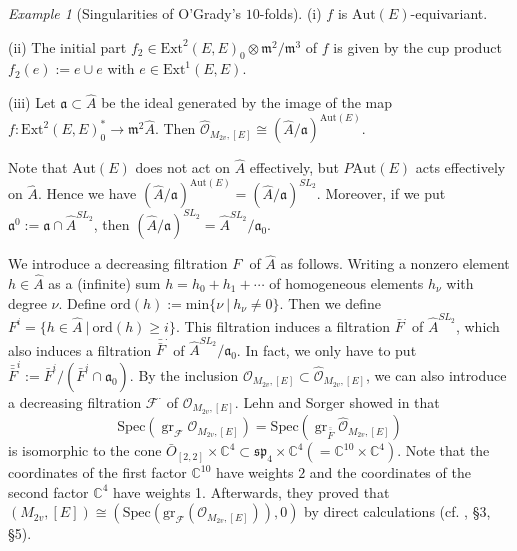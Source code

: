 \documentclass[12pt,a4paper]{amsart}
\theoremstyle{remark}
\newtheorem{ex}[Thm]{Example}
\theoremstyle{definition}
\newcommand{\gr}{\mathop{\mathrm{gr}}\nolimits}
\begin{document}
\begin{ex}[Singularities of O'Grady's $10$-folds]
(i) $f$ is $\mathrm{Aut}(E)$-equivariant.   

(ii) The initial part $f_2 \in \mathrm{Ext}^2(E, E)_0 \otimes \mathfrak{m}^2/\mathfrak{m}^3$ of $f$ is given by 
the cup product $f_2(e) := e \cup e$ with $e \in \mathrm{Ext}^1(E, E)$. 

(iii) Let $\mathfrak{a} \subset \hat{A}$ be the ideal generated by the image of the map 
$f: \mathrm{Ext}^2(E, E)_0^* \to \mathfrak{m}^2\hat{A}$. Then $\hat{\mathcal{O}}_{{M_{2v}}, [E]} \cong (\hat{A}/\mathfrak{a})^{\mathrm{Aut}(E)}$. 

Note that $\mathrm{Aut}(E)$ does not act on $\hat{A}$ effectively, but $P\mathrm{Aut}(E)$ acts effectively on 
$\hat{A}$. Hence we have $(\hat{A}/\mathfrak{a})^{\mathrm{Aut}(E)} = (\hat{A}/\mathfrak{a})^{SL_2}$. Moreover, if we put $\mathfrak{a}^0 := \mathfrak{a} \cap \hat{A}^{SL_2}$, then  $(\hat{A}/\mathfrak{a})^{SL_2} = \hat{A}^{SL_2}/\mathfrak{a}_0$. 

We introduce a decreasing filtration $F^{\cdot}$ of $\hat{A}$ as follows. Writing a nonzero element $h \in \hat{A}$ as a (infinite) sum  
$h = h_0 + h_1 + \cdots $ of homogeneous elements 
$h_\nu$ 
with degree $\nu$. 
Define $\mathrm{ord}(h) := \mathrm{min}\{\nu \:  \vert  \: h_{\nu} \ne 0\}.$ 
Then we define $F^i = \{h \in \hat{A}\: \vert \: \mathrm{ord}(h) \geq i\}$. This filtration induces a filtration $\bar{F}^{\cdot}$ of $\hat{A}^{SL_2}$, which also induces a filtration $\bar{\bar{F}}^{\cdot}$ of $\hat{A}^{SL_2}/\mathfrak{a}_0$. In fact, we only have to put 
$\bar{\bar{F}}^i := \bar{F}^i /(\bar{F}^i \cap \mathfrak{a}_0)$. By the inclusion $\mathcal{O}_{{M_{2v}}, [E]} \subset 
\hat{\mathcal{O}}_{{M_{2v}}, [E]}$, we can also introduce a decreasing filtration $\mathcal{F}^{\cdot}$ of    
$\mathcal{O}_{{M_{2v}}, [E]}$.  Lehn and Sorger showed in \cite[\S 4]{LS} that 
$$\mathrm{Spec}(\gr_{\mathcal{F}}\mathcal{O}_{{M_{2v}}, [E]}) = \mathrm{Spec}(\gr_{\bar{\bar{F}}}\hat{\mathcal{O}}_{{M_{2v}}, [E]})$$ is isomorphic to the cone 
$\bar{O}_{[2,2]} \times \mathbb{C}^4 \subset \mathfrak{sp}_4 \times \mathbb{C}^4 (= \mathbb{C}^{10} \times \mathbb{C}^4)$. 
Note that the coordinates of the first factor $\mathbb{C}^{10}$ have weights $2$ and the coordinates of the second factor 
$\mathbb{C}^4$ have weights 1. Afterwards, they proved that $(M_{2v}, [E]) \cong (\mathrm{Spec}(\mathrm{gr}_{\mathcal F}(\mathcal{O}_{{M_{2v}}, [E]})), 0)$ by direct calculations (cf. \cite{LS}, \S 3, \S 5). 


\end{ex}
\end{document}
